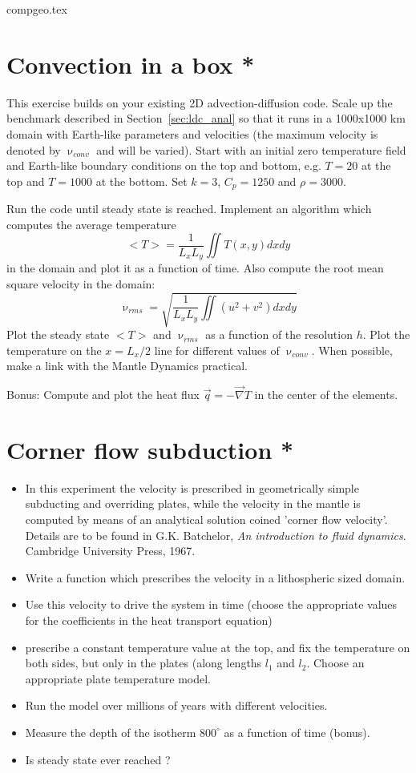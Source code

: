 \begin{flushright} {\tiny {\color{gray} compgeo.tex}} \end{flushright}

\section{Convection in a box *}

This exercise builds on your existing 2D advection-diffusion code. 
Scale up the benchmark described in Section~\ref{sec:ldc_anal} so that 
it runs in a 1000x1000 km domain with Earth-like parameters and velocities
(the maximum velocity is denoted by $\upnu_{conv}$ and will be varied).
Start with an initial zero temperature field and Earth-like boundary conditions 
on the top and bottom, e.g. $T=20$ at the top and $T=1000$ at the bottom. 
Set $k=3$, $C_p=1250$ and $\rho=3000$.

Run the code until steady state is reached. Implement an algorithm which computes the average 
temperature 
\[
<T> = \frac{1}{L_xL_y} \iint T(x,y) dx dy
\]
in the domain and plot it as a function of time.
Also compute the root mean square velocity in the domain:
\[
\upnu_{rms} = \sqrt{   \frac{1}{L_xL_y} \iint (u^2+v^2) dx dy  }
\]
Plot the steady state $<T>$ and $\upnu_{rms} $ as a function of the resolution $h$. 
Plot the temperature on the $x=L_x/2$ line for different values 
of $\upnu_{conv}$.
When possible, make a link with the Mantle Dynamics practical. 

Bonus: Compute and plot the heat flux $\vec{q}=-\vec\nabla T$ in the center of the elements.

\section{Corner flow subduction *}

\begin{itemize}
\item In this experiment the velocity is prescribed in geometrically simple subducting and overriding plates,
while the velocity in the mantle is computed by means of an analytical solution coined 'corner flow velocity'.
Details are to be found in G.K. Batchelor, {\it An introduction to fluid dynamics}. Cambridge University Press, 1967.
\item Write a function which prescribes the velocity in a lithospheric sized domain.
\item Use this velocity to drive the system in time (choose the appropriate values for the coefficients in the heat 
transport equation)
\item prescribe a constant temperature value at the top, and fix the temperature on both sides, but only in the 
plates (along lengths $l_1$ and $l_2$. Choose an appropriate plate temperature model.
\item Run the model over millions of years with different velocities.
\item Measure the depth of the isotherm $800^\circ$ as a function of time (bonus). 
\item Is steady state ever reached ?
\end{itemize}

